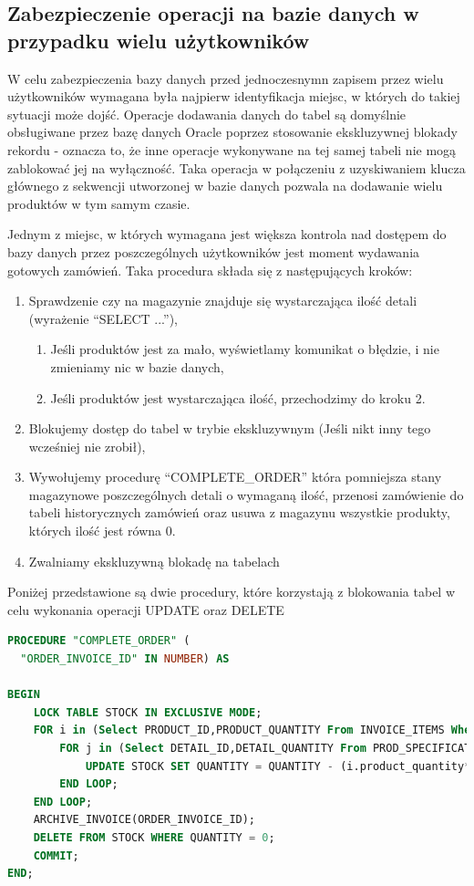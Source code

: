 \documentclass{article}
\begin{document}
\subsection{Zabezpieczenie operacji na bazie danych w przypadku wielu użytkowników}
W celu zabezpieczenia bazy danych przed jednoczesnymn zapisem przez wielu
użytkowników wymagana była najpierw identyfikacja miejsc, w których do takiej sytuacji
może dojść. Operacje dodawania danych do tabel są domyślnie obsługiwane przez
bazę danych Oracle poprzez stosowanie ekskluzywnej blokady rekordu - oznacza to,
że inne operacje wykonywane na tej samej tabeli nie mogą zablokować jej na
wyłączność. Taka operacja w połączeniu z uzyskiwaniem klucza głównego z
sekwencji utworzonej w bazie danych pozwala na dodawanie wielu produktów w tym
samym czasie.

Jednym z miejsc, w których wymagana jest większa kontrola nad dostępem do bazy
danych przez poszczególnych użytkowników jest moment wydawania gotowych
zamówień. Taka procedura składa się z następujących kroków:
\begin{enumerate}
   \item Sprawdzenie czy na magazynie znajduje się wystarczająca ilość detali
         (wyrażenie ``SELECT ...''),
         \begin{enumerate}
            \item Jeśli produktów jest za mało, wyświetlamy komunikat o błędzie, i nie
                  zmieniamy nic w bazie danych,
            \item Jeśli produktów jest wystarczająca ilość, przechodzimy do kroku 2.
         \end{enumerate}
   \item Blokujemy dostęp do tabel w trybie ekskluzywnym (Jeśli nikt inny tego wcześniej nie zrobił),
   \item Wywołujemy procedurę ``COMPLETE\_ORDER'' która pomniejsza stany
         magazynowe poszczególnych detali o wymaganą ilość, przenosi zamówienie do
         tabeli historycznych zamówień oraz usuwa z magazynu wszystkie produkty,
         których ilość jest równa 0.
   \item Zwalniamy ekskluzywną blokadę na tabelach
\end{enumerate}
Poniżej przedstawione są dwie procedury, które korzystają z blokowania tabel w
celu wykonania operacji UPDATE oraz DELETE
\begin{lstlisting}[language=sql, frame=single,tabsize=1,breaklines=true,caption={Procedura COMPLETE\_ORDER}]
   PROCEDURE "COMPLETE_ORDER" (
  "ORDER_INVOICE_ID" IN NUMBER) AS

BEGIN 
	LOCK TABLE STOCK IN EXCLUSIVE MODE;
	FOR i in (Select PRODUCT_ID,PRODUCT_QUANTITY From INVOICE_ITEMS Where Invoice_ID=ORDER_INVOICE_ID) LOOP
		FOR j in (Select DETAIL_ID,DETAIL_QUANTITY From PROD_SPECIFICATION Where PRODUCT_ID = i.product_id) LOOP
			UPDATE STOCK SET QUANTITY = QUANTITY - (i.product_quantity*j.detail_quantity) Where DETAIL_ID=j.detail_id;
		END LOOP;
	END LOOP;
    ARCHIVE_INVOICE(ORDER_INVOICE_ID);
	DELETE FROM STOCK WHERE QUANTITY = 0;
	COMMIT;
END;
\end{lstlisting}
\end{document}
